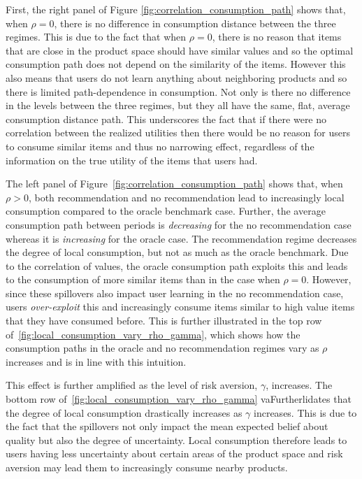 \documentclass[manuscript]{acmart}
\begin{document}
First, the right panel of Figure \ref{fig:correlation_consumption_path} shows that, when $\rho = 0$, there is no difference in consumption distance between the three regimes. This is due to the fact that when $\rho = 0$, there is no reason that items that are close in the product space should have similar values and so the optimal consumption path does not depend on the similarity of the items. However this also means that users do not learn anything about neighboring products and so there is limited path-dependence in consumption. Not only is there no difference in the levels between the three regimes, but they all have the same, flat, average consumption distance path. This underscores the fact that if there were no correlation between the realized utilities then there would be no reason for users to consume similar items and thus no narrowing effect, regardless of the information on the true utility of the items that users had.
\par
The left panel of Figure~\ref{fig:correlation_consumption_path} shows that, when $\rho > 0$, both recommendation and no recommendation lead to increasingly local consumption compared to the oracle benchmark case. Further, the average consumption path between periods is \textit{decreasing} for the no recommendation case whereas it is \textit{increasing} for the oracle case. The recommendation regime decreases the degree of local consumption, but not as much as the oracle benchmark. Due to the correlation of values, the oracle consumption path exploits this and leads to the consumption of more similar items than in the case when $\rho = 0$. However, since these spillovers also impact user learning in the no recommendation case, users \textit{over-exploit} this and increasingly consume items similar to high value items that they have consumed before. This is further illustrated in the top row of~\autoref{fig:local_consumption_vary_rho_gamma}, which shows how the consumption paths in the oracle and no recommendation regimes vary as $\rho$ increases and is in line with this intuition.
\par
This effect is further amplified as the level of risk aversion, $\gamma$, increases. The bottom row of~\autoref{fig:local_consumption_vary_rho_gamma} vaFurtherlidates that the degree of local consumption drastically increases as $\gamma$ increases. This is due to the fact that the spillovers not only impact the mean expected belief about quality but also the degree of uncertainty. Local consumption therefore leads to users having less uncertainty about certain areas of the product space and risk aversion may lead them to increasingly consume nearby products.
\end{document}
